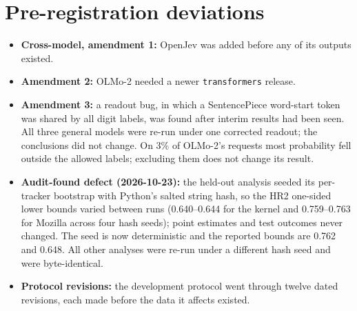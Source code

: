 \section{Pre-registration deviations}
\label{app:deviations}
\begin{itemize}
  \item \textbf{Cross-model, amendment 1:} OpenJev was added before any of
  its outputs existed.
  \item \textbf{Amendment 2:} OLMo-2 needed a newer \texttt{transformers}
  release.
  \item \textbf{Amendment 3:} a readout bug, in which a SentencePiece
  word-start token was shared by all digit labels, was found after interim
  results had been seen. All three general models were re-run under one
  corrected readout; the conclusions did not change. On 3\% of OLMo-2's
  requests most probability fell outside the allowed labels; excluding
  them does not change its result.
  \item \textbf{Audit-found defect (2026-10-23):} the held-out analysis
  seeded its per-tracker bootstrap with Python's salted string hash, so
  the HR2 one-sided lower bounds varied between runs (0.640--0.644 for the
  kernel and 0.759--0.763 for Mozilla across four hash seeds); point
  estimates and test outcomes never changed. The seed is now deterministic
  and the reported bounds are 0.762 and 0.648. All other analyses were
  re-run under a different hash seed and were byte-identical.
  \item \textbf{Protocol revisions:} the development protocol went
  through twelve dated revisions, each made before the data it affects
  existed.
\end{itemize}



